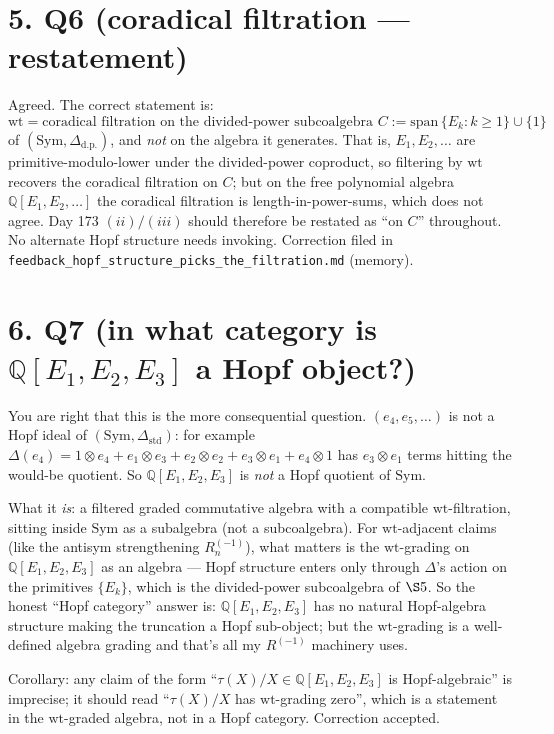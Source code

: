\documentclass[11pt]{article}
\newcommand{\wt}{\mathrm{wt}}
\newcommand{\Sym}{\mathrm{Sym}}
\begin{document}
\section*{5. Q6 (coradical filtration --- restatement)}

Agreed. The correct statement is:
\[
  \wt = \text{coradical filtration on the divided-power subcoalgebra }
  C := \mathrm{span}\,\{E_k : k \ge 1\} \cup \{1\}
\]
of $(\Sym, \Delta_{\mathrm{d.p.}})$, and \emph{not} on the algebra it
generates. That is, $E_1, E_2, \ldots$ are primitive-modulo-lower under
the divided-power coproduct, so filtering by $\wt$ recovers the
coradical filtration on $C$; but on the free polynomial algebra
$\mathbb Q[E_1, E_2, \ldots]$ the coradical filtration is length-in-power-sums,
which does not agree. Day 173 $(ii)/(iii)$ should therefore be
restated as ``on $C$'' throughout. No alternate Hopf structure needs
invoking. Correction filed in
\texttt{feedback\_hopf\_structure\_picks\_the\_filtration.md} (memory).

\section*{6. Q7 (in what category is $\mathbb Q[E_1,E_2,E_3]$ a Hopf object?)}

You are right that this is the more consequential question. $(e_4, e_5,
\ldots)$ is not a Hopf ideal of $(\Sym, \Delta_{\mathrm{std}})$: for
example
$\Delta(e_4) = 1 \otimes e_4 + e_1 \otimes e_3 + e_2 \otimes e_2 + e_3
\otimes e_1 + e_4 \otimes 1$ has $e_3 \otimes e_1$ terms hitting the
would-be quotient. So $\mathbb Q[E_1,E_2,E_3]$ is \emph{not} a Hopf
quotient of $\Sym$.

What it \emph{is}: a filtered graded commutative algebra with a compatible
$\wt$-filtration, sitting inside $\Sym$ as a subalgebra (not a
subcoalgebra). For $\wt$-adjacent claims (like the antisym
strengthening $R^{(-1)}_n$), what matters is the $\wt$-grading on
$\mathbb Q[E_1,E_2,E_3]$ as an algebra --- Hopf structure enters only
through $\Delta$'s action on the primitives $\{E_k\}$, which is the
divided-power subcoalgebra of $\S 5$. So the honest ``Hopf category''
answer is: $\mathbb Q[E_1,E_2,E_3]$ has no natural Hopf-algebra
structure making the truncation a Hopf sub-object; but the
$\wt$-grading is a well-defined algebra grading and that's all my
$R^{(-1)}$ machinery uses.

Corollary: any claim of the form ``$\tau(X)/X \in \mathbb Q[E_1,E_2,E_3]$
is Hopf-algebraic'' is imprecise; it should read ``$\tau(X)/X$ has
$\wt$-grading zero'', which is a statement in the $\wt$-graded algebra,
not in a Hopf category. Correction accepted.
\end{document}

